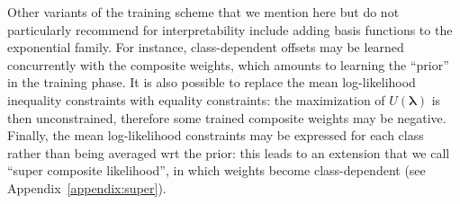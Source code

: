 \documentclass[english]{scrartcl}
\newcommand{\lda}{{\boldsymbol{\lambda}}}
\begin{document}
Other variants of the training scheme that we mention here but do not particularly recommend for interpretability include adding basis functions to the exponential family. For instance, class-dependent offsets may be learned concurrently with the composite weights, which amounts to learning the ``prior'' in the training phase. It is also possible to replace the mean log-likelihood inequality constraints with equality constraints: the maximization of $U(\lda)$ is then unconstrained, therefore some trained composite weights may be negative. Finally, the mean log-likelihood constraints may be expressed for each class rather than being averaged wrt the prior: this leads to an extension that we call ``super composite likelihood'', in which weights become class-dependent (see Appendix~\ref{appendix:super}).









\end{document}
